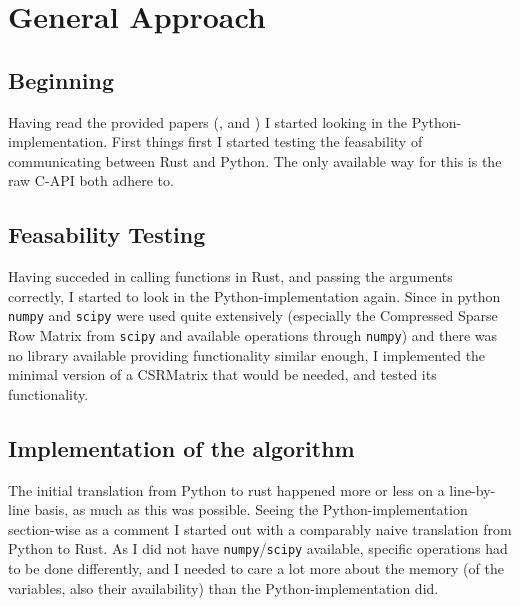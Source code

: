\newpage
\section{General Approach}\label{sec:approach}




\subsection{Beginning}


Having read the provided papers (\cite{imakaev2012iterative},
\cite{lieberman2009comprehensive} and \cite{wingett2015hicup}) I started
looking in the Python-implementation. First things first I started testing the
feasability of communicating between Rust and Python. The only available way
for this is the raw C-API both adhere to.

\subsection{Feasability Testing}


Having succeded in calling functions in Rust, and passing the arguments
correctly, I started to look in the Python-implementation again. Since in
python \verb|numpy| and \verb|scipy| were used quite extensively (especially
the Compressed Sparse Row Matrix from \verb|scipy| and available operations
through \verb|numpy|) and there was no library available providing
functionality similar enough, I implemented the minimal version of a CSRMatrix
that would be needed, and tested its functionality.


\subsection{Implementation of the algorithm}


The initial translation from Python to rust happened more or less on a
line-by-line basis, as much as this was possible. Seeing the
Python-implementation section-wise as a comment I started out with a comparably
naive translation from Python to Rust. As I did not have
\verb|numpy|/\verb|scipy| available, specific operations had to be done
differently, and I needed to care a lot more about the memory (of the
variables, also their availability) than the Python-implementation did.


